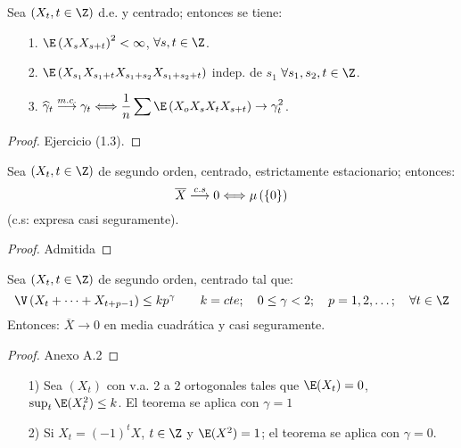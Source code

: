 \begin{teorema}
 Sea $\left( X_{t}, t\in \Z \right)$ d.e. y centrado; entonces se tiene:
\begin{enumerate}
 \item[1.] $\E\left( {X_{s} X_{s+t} } \right)^{2}<\infty $, $\forall 
s,t\in \Z$.

\item[2.] $\E\left(X_{s_{1} } X_{s_{1} +t} X_{s_{1} +s_{2} } X_{s_{1} 
+s_{2} +t} \right)$ indep. de $s_{1}$ $ \forall s_{1} ,s_{2} 
,t\in \Z$.

\item[3.] $\displaystyle\widehat{\gamma}_{t} \buildrel {m.c.} \over 
\longrightarrow \gamma_{t} \Longleftrightarrow \frac{1}{n}\sum 
{\E\left( {X_{o} X_{s} X_{t} X_{s+t} } \right)\to \gamma_{t}^{2} } $.
\end{enumerate}
\end{teorema}

\begin{proof}
 Ejercicio (1.3).
\end{proof}

\begin{teorema}
Sea $\left( X_{t} ,t\in \Z \right)$ de segundo orden, centrado, estrictamente estacionario; entonces:
\[
\overline{X}\buildrel {c.s} \over \longrightarrow 0\Longleftrightarrow \mu \left( 
\left\{ 0 \right\} \right)
\]
(c.s: expresa casi seguramente).
\end{teorema}

\begin{proof}
 Admitida
\end{proof}


\begin{teorema}
Sea $\left(X_{t} ,t\in \Z \right)$ de segundo orden, centrado tal 
que:
\[
\V\left( {X_{t} +\cdots+X_{t+p-1} } \right)\leq kp^{\gamma }
\qquad
k=cte;
\quad
0\leq \gamma <2;
\quad
p=1,2,\ldots;\quad \forall t\in\Z
\]
Entonces: $\overline{{X}}\to 0$ en media cuadr\'{a}tica y casi seguramente.
\end{teorema}

\begin{proof}
 Anexo A.2
\end{proof}

\begin{ejemplo}
\quad
\begin{enumerate}
\item[1)] Sea $\left( {X_{t} } \right)$ con v.a. 2 a 2 ortogonales tales que $\E(X_{t})=0$, $\sup_{t} \E(X_{t}^{2}) \leq k$. El teorema se aplica con $\gamma =1$
\item[2)] Si $X_{t} =\left( {-1} \right)^{t}X$, $t\in \Z$ y $\E(X^{2})=1$; el teorema se aplica con $\gamma =0$.
\end{enumerate}
\end{ejemplo}

